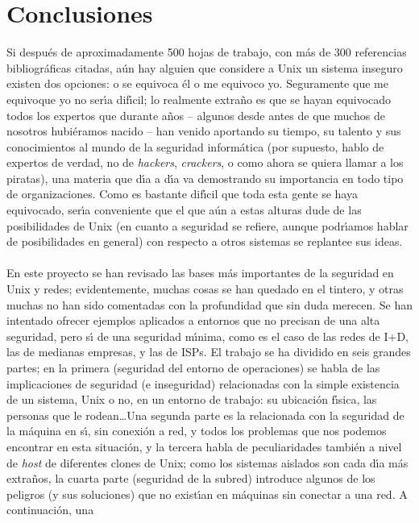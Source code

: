 \chapter{Conclusiones}
Si despu\'es de aproximadamente 500 hojas de trabajo, con m\'as de 300 
referencias
bibliogr\'aficas citadas, a\'un hay alguien que considere a Unix 
un sistema inseguro existen dos opciones: o se e\-qui\-vo\-ca \'el o me 
equivoco yo. 
Seguramente que me equivoque yo no ser\'{\i}a dif\'{\i}cil; lo realmente 
extra\~no es que se hayan equivocado todos los expertos que 
durante a\~nos -- algunos desde antes de que muchos de nosotros hubi\'eramos 
nacido -- han venido aportando su tiempo, su talento y sus conocimientos al 
mundo de la seguridad inform\'atica (por supuesto, hablo de expertos de
verdad, no de {\it hackers}, {\it crackers}, o como ahora se quiera llamar a los
piratas), una materia que d\'{\i}a a d\'{\i}a va demostrando su importancia en 
todo tipo de organizaciones. Como es bastante dif\'{\i}cil que toda esta gente 
se haya 
equivocado, ser\'{\i}a conveniente que el que a\'un a estas alturas dude de las 
posibilidades de Unix (en cuanto a seguridad se refiere, aunque podr\'{\i}amos
hablar de posibilidades en general) con respecto a otros sistemas se replantee
sus ideas.\\
\\En este proyecto se han revisado las bases m\'as importantes de la seguridad
en Unix y redes; evidentemente, muchas cosas se han quedado en el tintero, y
otras muchas no han sido comentadas con la profundidad que sin duda merecen. Se
han intentado ofrecer ejemplos aplicados a entornos que no precisan de una alta 
seguridad, pero s\'{\i} de una seguridad m\'{\i}nima, como es el caso de las 
redes de I+D, las de medianas empresas, y las de ISPs. El trabajo se ha 
dividido en seis grandes partes;
en la primera (seguridad del entorno de operaciones) se habla de las 
implicaciones de seguridad (e inseguridad) relacionadas con la simple existencia
de un sistema, Unix o no, en un entorno de trabajo: su ubicaci\'on f\'{\i}sica,
las personas que le rodean\ldots Una segunda parte es la relacionada con la
seguridad de la m\'aquina en s\'{\i}, sin conexi\'on a red, y todos los 
problemas que nos podemos encontrar en esta situaci\'on, y la tercera habla de
peculiaridades tambi\'en a nivel de {\it host} de diferentes clones de Unix; 
como los sistemas 
aislados son cada d\'{\i}a m\'as extra\~nos, la cuarta parte (seguridad de la
subred) introduce algunos de los peligros (y sus soluciones) que no 
exist\'{\i}an en m\'aquinas sin conectar a una red. A continuaci\'on, una 
